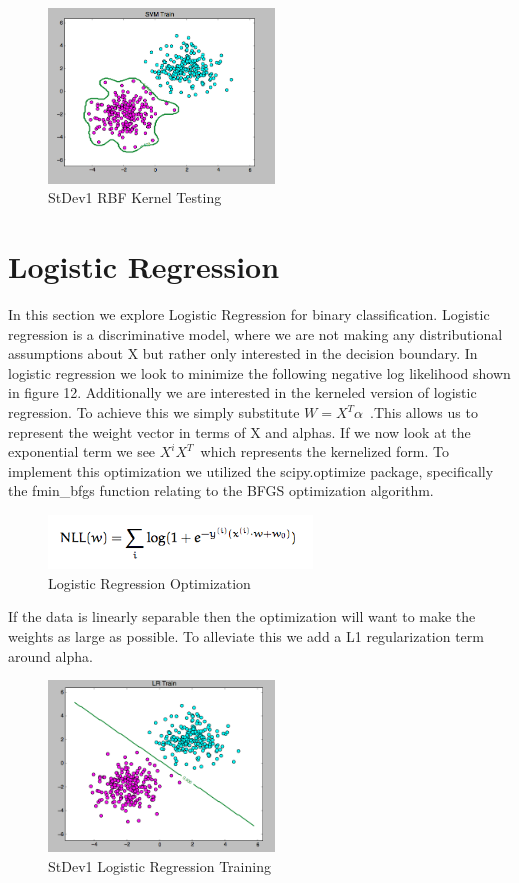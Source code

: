 \documentclass[pageno]{jpaper}
\begin{document}
\begin{figure}[ht!]
\centering
\includegraphics[width=60mm]{stdev1_gauss_test}
\caption{StDev1 RBF Kernel Testing}
\label{overflow}
\end{figure}


\section{Logistic Regression}

In this section we explore Logistic Regression for binary classification. Logistic regression is a discriminative model, where we are not making any distributional assumptions about X but rather only interested in the decision boundary. In logistic regression we look to minimize the following negative log likelihood shown in figure 12. Additionally we are interested in the kerneled version of logistic regression. To achieve this we simply substitute $W=X^{T}\alpha$\ .This allows us to represent the weight vector in terms of X and alphas. If we now look at the exponential term we see  $X^{i}X^{T}$\ which represents the kernelized form. To implement this optimization we utilized the scipy.optimize package, specifically the fmin\_bfgs function relating to the BFGS optimization algorithm. 

\begin{figure}[ht!]
\centering
\includegraphics[width=70mm]{nll}
\caption{Logistic Regression Optimization}
\end{figure}
If the data is linearly separable then the optimization will want to make the weights as large as possible. To alleviate this we add a L1 regularization term around alpha. 

\begin{figure}[ht!]
\centering
\includegraphics[width=60mm]{stdev1_lr_train}
\caption{StDev1 Logistic Regression Training}
\label{overflow}
\end{figure}
\end{document}

